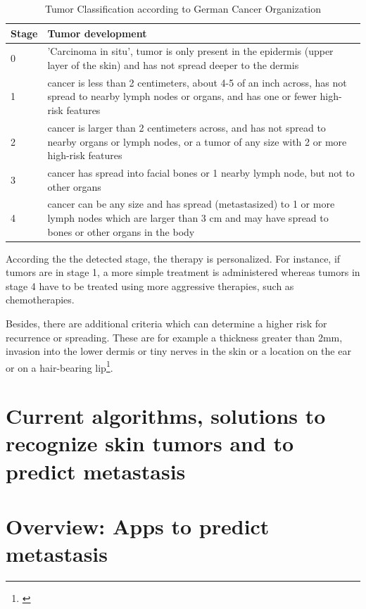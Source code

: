 \begin{table}[h!]
\begin{center}
\begin{tabularx}{\textwidth}{|XX|}
  \textbf{Stage} & \textbf{Tumor development} \\
\hline
0 & 'Carcinoma in situ', tumor is only present in the epidermis (upper layer of the skin) and has not spread deeper to the dermis \\
1 & cancer is less than 2 centimeters, about 4-5 of an inch across, has not spread to nearby lymph nodes or organs, and has one or fewer high-risk features  \\
2 & cancer is larger than 2 centimeters across, and has not spread to nearby organs or lymph nodes, or a tumor of any size with 2 or more high-risk features \\
3 & cancer has spread into facial bones or 1 nearby lymph node, but not to other organs  \\
4 & cancer can be any size and has spread (metastasized) to 1 or more lymph nodes which are larger than 3 cm and may have spread to bones or other organs in the body \\
\end{tabularx}
\caption{Tumor Classification according to German Cancer Organization} \label{table_tnm}         
\end{center}
\end{table}

According the the detected stage, the therapy is personalized. For instance, if tumors are in stage 1, a more simple treatment is administered whereas tumors in stage 4 have to be treated using more aggressive therapies, such as chemotherapies.   

Besides, there are additional criteria which can determine a higher risk for recurrence or spreading. These are for example a thickness greater than 2mm, invasion into the lower dermis or tiny nerves in the skin or a location on the ear or on a hair-bearing lip\footnote{\cite{skin_cancer_types}}.

\section{Current algorithms, solutions to recognize skin tumors and to predict metastasis}

\section{Overview: Apps to predict metastasis}

